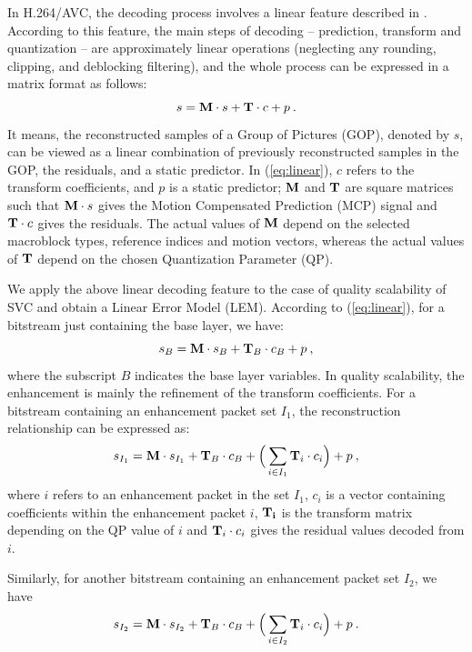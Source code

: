 \documentclass[journal]{IEEEtran}
\begin{document}
In H.264/AVC, the decoding process involves a linear feature described in \cite{Winken08}. According to this feature, the main steps of decoding -- prediction, transform and quantization -- are approximately linear operations (neglecting any rounding, clipping, and deblocking filtering), and the whole process can be expressed in a matrix format as follows:
\begin{equation}
\label{eq:linear}
s = {\rm\bf M} \cdot s + {\rm\bf T} \cdot c + p \: .
\end{equation}
It means, the reconstructed samples of a Group of Pictures (GOP), denoted by $s$, can be viewed as a linear combination of previously reconstructed samples in the GOP, the residuals, and a static predictor. In (\ref{eq:linear}), $c$ refers to the transform coefficients, and $p$ is a static predictor; ${\rm\bf M}$ and ${\rm\bf T}$ are square matrices such that ${\rm\bf M} \cdot s$ gives the Motion Compensated Prediction (MCP) signal and ${\rm\bf T} \cdot c$ gives the residuals. The actual values of ${\rm\bf M}$ depend on the selected macroblock types, reference indices and motion vectors, whereas the actual values of ${\rm\bf T}$ depend on the chosen Quantization Parameter (QP).

We apply the above linear decoding feature to the case of quality scalability of SVC and obtain a Linear Error Model (LEM). According to (\ref{eq:linear}), for a bitstream just containing the base layer, we have:
\begin{equation}
\label{eq:base0}
s_{B} = {\rm\bf M} \cdot s_{B} + {\rm\bf T}_{B} \cdot c_{B} + p \: ,
\end{equation}
where the subscript $B$ indicates the base layer variables. In quality scalability, the enhancement is mainly the refinement of the transform coefficients. For a bitstream containing an enhancement packet set $I_1$, the reconstruction relationship can be expressed as:
\begin{equation}
\label{eq:subset1}
s_{I_1} = {\rm\bf M} \cdot s_{I_1} + {\rm\bf T}_{B} \cdot c_{B} + \Big( \sum_{i \in I_1}{\rm\bf T}_i \cdot c_i \Big) + p \: ,
\end{equation}
where $i$ refers to an enhancement packet in the set $I_1$, $c_i$ is a vector containing coefficients within the enhancement packet $i$, ${\rm\bf T_i}$ is the transform matrix depending on the QP value of $i$ and ${\rm\bf T}_i \cdot c_i$ gives the residual values decoded from $i$.

Similarly, for another bitstream containing an enhancement packet set $I_2$, we have
\begin{equation}
\label{eq:subset2}
s_{I_2} = {\rm\bf M} \cdot s_{I_2} + {\rm\bf T}_{B} \cdot c_{B} + \Big( \sum_{i \in I_2}{\rm\bf T}_i \cdot c_i \Big) + p \: .
\end{equation}
\end{document}

